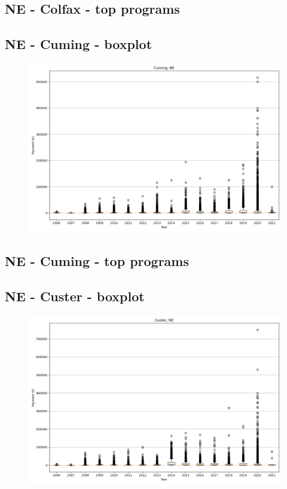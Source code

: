 \subsection*{NE - Colfax - top programs}

\newpage
\subsection*{NE - Cuming - boxplot}
\begin{figure}[h]
\centering
\includegraphics[width=7in]{../output/boxplots/counties/Cuming-NE_boxplot.png}
\end{figure}


\subsection*{NE - Cuming - top programs}

\newpage
\subsection*{NE - Custer - boxplot}
\begin{figure}[h]
\centering
\includegraphics[width=7in]{../output/boxplots/counties/Custer-NE_boxplot.png}
\end{figure}


